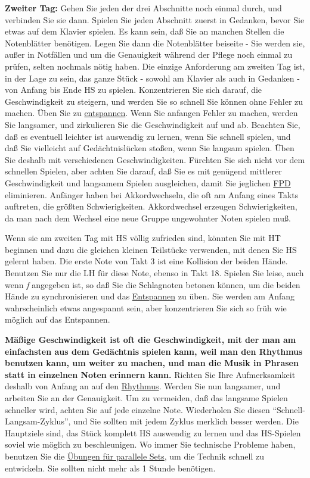 \textbf{Zweiter Tag:} Gehen Sie jeden der drei Abschnitte noch einmal durch, und verbinden Sie sie dann.
Spielen Sie jeden Abschnitt zuerst in Gedanken, bevor Sie etwas auf dem Klavier spielen.
Es kann sein, daß Sie an manchen Stellen die Notenblätter benötigen.
Legen Sie dann die Notenblätter beiseite - Sie werden sie, außer in Notfällen und um die Genauigkeit während der Pflege noch einmal zu prüfen, selten nochmals nötig haben.
Die einzige Anforderung am zweiten Tag ist, in der Lage zu sein, das ganze Stück - sowohl am Klavier als auch in Gedanken - von Anfang bis Ende HS zu spielen.
Konzentrieren Sie sich darauf, die Geschwindigkeit zu steigern, und werden Sie so schnell Sie können ohne Fehler zu machen.
Üben Sie zu \hyperlink{c1ii14}{entspannen}.
Wenn Sie anfangen Fehler zu machen, werden Sie langsamer, und zirkulieren Sie die Geschwindigkeit auf und ab.
Beachten Sie, daß es eventuell leichter ist auswendig zu lernen, wenn Sie schnell spielen, und daß Sie vielleicht auf Gedächtnislücken stoßen, wenn Sie langsam spielen.
Üben Sie deshalb mit verschiedenen Geschwindigkeiten.
Fürchten Sie sich nicht vor dem schnellen Spielen, aber achten Sie darauf, daß Sie es mit genügend mittlerer Geschwindigkeit und langsamem Spielen ausgleichen, damit Sie jeglichen \hyperlink{fpd}{FPD} eliminieren.
Anfänger haben bei Akkordwechseln, die oft am Anfang eines Takts auftreten, die größten Schwierigkeiten.
Akkordwechsel erzeugen Schwierigkeiten, da man nach dem Wechsel eine neue Gruppe ungewohnter Noten spielen muß.

Wenn sie am zweiten Tag mit HS völlig zufrieden sind, könnten Sie mit HT beginnen und dazu die gleichen kleinen Teilstücke verwenden, mit denen Sie HS gelernt haben.
Die erste Note von Takt 3 ist eine Kollision der beiden Hände. Benutzen Sie nur die LH für diese Note, ebenso in Takt 18.
Spielen Sie leise, auch wenn \textit{f} angegeben ist, so daß Sie die Schlagnoten betonen können, um die beiden Hände zu synchronisieren und das \hyperlink{c1ii14}{Entspannen} zu üben.
Sie werden am Anfang wahrscheinlich etwas angespannt sein, aber konzentrieren Sie sich so früh wie möglich auf das Entspannen.

\textbf{Mäßige Geschwindigkeit ist oft die Geschwindigkeit, mit der man am einfachsten aus dem Gedächtnis spielen kann, weil man den Rhythmus benutzen kann, um weiter zu machen, und man die Musik in Phrasen statt in einzelnen Noten erinnern kann.}
Richten Sie Ihre Aufmerksamkeit deshalb von Anfang an auf den \hyperlink{c1iii1b}{Rhythmus}.
Werden Sie nun langsamer, und arbeiten Sie an der Genauigkeit.
Um zu vermeiden, daß das langsame Spielen schneller wird, achten Sie auf jede einzelne Note.
Wiederholen Sie diesen \enquote{Schnell-Langsam-Zyklus}, und Sie sollten mit jedem Zyklus merklich besser werden.
Die Hauptziele sind, das Stück komplett HS auswendig zu lernen und das HS-Spielen soviel wie möglich zu beschleunigen.
Wo immer Sie technische Probleme haben, benutzen Sie die \hyperlink{c1iii7b}{Übungen für parallele Sets}, um die Technik schnell zu entwickeln.
Sie sollten nicht mehr als 1 Stunde benötigen.

